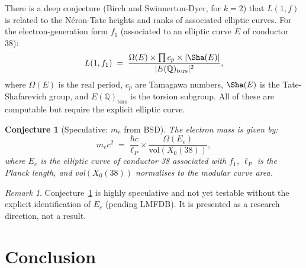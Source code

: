 \documentclass[12pt,a4paper]{article}
\newtheorem{conjecture}[theorem]{Conjecture}
\theoremstyle{definition}
\theoremstyle{remark}
\newtheorem{remark}[theorem]{Remark}
\begin{document}
There is a deep conjecture (Birch and Swinnerton-Dyer, for $k=2$) that
$L(1,f)$ is related to the N\'eron-Tate heights and ranks of associated
elliptic curves.  For the electron-generation form $f_1$ (associated
to an elliptic curve $E$ of conductor 38):
\begin{equation}
  L(1,f_1) \;=\; \frac{\Omega(E) \times \prod c_p \times |\Sha(E)|}
                       {|E(\mathbb{Q})_{\mathrm{tors}}|^2},
\end{equation}
where $\Omega(E)$ is the real period, $c_p$ are Tamagawa numbers,
$\Sha(E)$ is the Tate-Shafarevich group, and $E(\mathbb{Q})_{\mathrm{tors}}$
is the torsion subgroup.  All of these are computable but require the
explicit elliptic curve.

\begin{conjecture}[Speculative: $m_e$ from BSD]
\label{conj:BSD}
The electron mass is given by:
\begin{equation}
  m_e c^2 \;=\; \frac{\hbar c}{\ell_P} \times \frac{\Omega(E_e)}{\text{vol}(X_0(38))},
\end{equation}
where $E_e$ is the elliptic curve of conductor 38 associated with $f_1$,
$\ell_P$ is the Planck length, and vol$(X_0(38))$ normalises to the
modular curve area.
\end{conjecture}

\begin{remark}
Conjecture~\ref{conj:BSD} is highly speculative and not yet testable
without the explicit identification of $E_e$ (pending LMFDB).  It is
presented as a research direction, not a result.
\end{remark}

\section{Conclusion}
\label{sec:conclusion}
\end{document}
